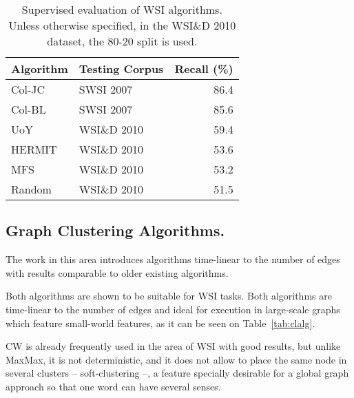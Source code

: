 \begin{table}
\centering
\caption{\label{tab:wsi} Supervised evaluation of \ac{WSI} algorithms. Unless
otherwise specified, in the WSI\&D 2010 dataset, the 80-20 split is used.}

\begin{tabu} to \textwidth { XXr }
\hline
\textbf{Algorithm} & \textbf{Testing Corpus} & \textbf{Recall} (\%)\\
\hline
Col-JC \cite{klapaftis2008word}           & \ac{SWSI} 2007 & 86.4 \\
Col-BL \cite{klapaftis2008word}           & \ac{SWSI} 2007 & 85.6 \\
UoY \cite{korkontzelos2010uoy}            & WSI\&D 2010    & 59.4 \\
HERMIT \cite{jurgens2010hermit}           & WSI\&D 2010    & 53.6 \\
\hline
MFS \cite{manandhar2010semeval}           & WSI\&D 2010    & 53.2 \\
Random \cite{manandhar2010semeval}        & WSI\&D 2010    & 51.5 \\
\hline
\end{tabu}
\end{table}

\subsection{Graph Clustering Algorithms.}

The work in this area introduces algorithms time-linear to the number of edges
with results comparable to older existing algorithms.

Both algorithms are shown to be suitable for \ac{WSI} tasks. Both algorithms are
time-linear to the number of edges and ideal for execution in large-scale graphs
which feature small-world features, as it can be seen on Table~\ref{tab:clalg}.

\ac{CW} is already frequently used in the area of \ac{WSI} with good results,
but unlike MaxMax, it is not deterministic, and it does not allow to place the
same node in several clusters -- soft-clustering --, a feature specially
desirable for a global graph approach so that one word can have several senses.

